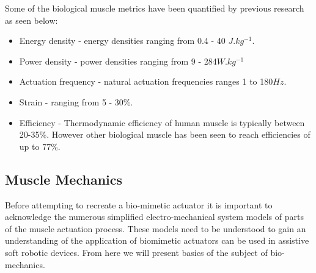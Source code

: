 Some of the biological muscle metrics have been quantified by previous research as seen below:
\begin{itemize}
    \item Energy density - energy densities ranging from 0.4 - 40 $J.kg^{-1}$\citep{Alexander1977}.
    \item Power density - power densities ranging from 9 - 284$W.kg^{-1}$\citep{Full2004}
    \item Actuation frequency - natural actuation frequencies ranges 1 to 180$Hz$\citep{Full2004}.
    \item Strain - ranging from 5 - 30\%\citep{Duduta2019}.
    \item Efficiency - Thermodynamic efficiency of human muscle is typically between 20-35\%\citep{Smith2005}. However other biological muscle has been seen to reach efficiencies of up to 77\%\citep{Smith2005}.
\end{itemize}
    

\subsection{Muscle Mechanics}
Before attempting to recreate a bio-mimetic actuator it is important to acknowledge the numerous simplified electro-mechanical system models of parts of the muscle actuation process. These models need to be understood to gain an understanding of the application of biomimetic actuators can be used in assistive soft robotic devices. From here we will present basics of the subject of bio-mechanics.

